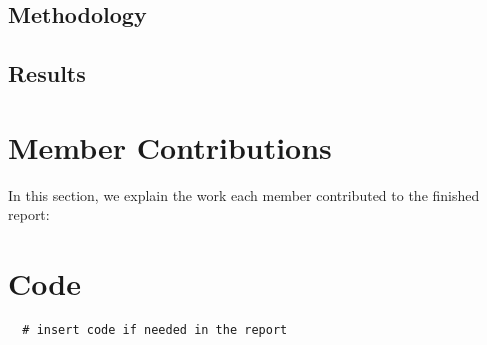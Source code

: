 \documentclass{article}
\begin{document}
\subsection{Methodology}

\subsection{Results}

\newpage
\section{Member Contributions}
In this section, we explain the work each member contributed to the finished report:\linebreak

\newpage
\appendix
\section{Code}
\begin{verbatim}
  # insert code if needed in the report
  
\end{verbatim}
\end{document}
